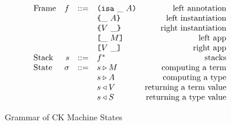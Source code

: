 \documentclass[../main.tex]{subfiles}
\begin{document}
\begin{figure*}
    \centering
    \[\begin{array}{lrclr}
        \textrm{Frame} & f  & ::= & \texttt{(} \texttt{isa} ~ \_ ~ A \texttt{)}                    & \textrm{left annotation}\\
                       &    &     & \texttt{\{}\_ ~ A\texttt{\}}                   & \textrm{left instantiation}\\
                       &    &     & \texttt{\{}V ~ \_\texttt{\}}                  & \textrm{right instantiation}\\
                       &    &     & \texttt{[} \_ ~ M \texttt{]}                    & \textrm{left app}\\
                       &    &     & \texttt{[} V ~ \_ \texttt{]}                   & \textrm{right app}\\
        \textrm{Stack} & s      & ::= & f^*                               & \textrm{stacks}\\
        \textrm{State} & \sigma & ::= & s \triangleright M                  & \textrm{computing a term}\\
                       &        &     & s \triangleright A                  & \textrm{computing a type}\\
                       &        &     & s \triangleleft V                 & \textrm{returning a term value}\\
                       &        &     & s \triangleleft S                 & \textrm{returning a type value}\\
    \end{array}\]
    
    \caption{Grammar of CK Machine States}
    \label{fig:Plutus_core_ck_frames}
\end{figure*}
\end{document}
